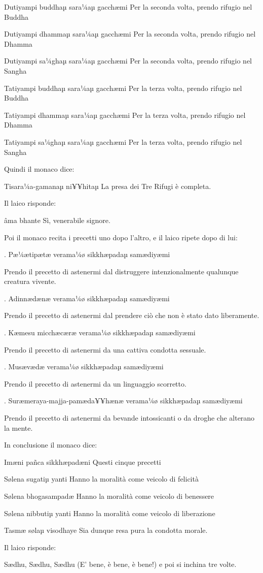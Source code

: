 Dutiyampi buddhaµ sara¼aµ gacchæmi Per la seconda volta, prendo rifugio
nel Buddha

Dutiyampi dhammaµ sara¼aµ gacchæmi Per la seconda volta, prendo rifugio
nel Dhamma

Dutiyampi sa¼ghaµ sara¼aµ gacchæmi Per la seconda volta, prendo rifugio
nel Sangha

Tatiyampi buddhaµ sara¼aµ gacchæmi Per la terza volta, prendo rifugio
nel Buddha

Tatiyampi dhammaµ sara¼aµ gacchæmi Per la terza volta, prendo rifugio
nel Dhamma

Tatiyampi sa¼ghaµ sara¼aµ gacchæmi Per la terza volta, prendo rifugio
nel Sangha

Quindi il monaco dice:

Tisara¼a-gamanaµ ni¥¥hitaµ La presa dei Tre Rifugi è completa.

Il laico risponde:

âma bhante Sì, venerabile signore.

Poi il monaco recita i precetti uno dopo l'altro, e il laico ripete dopo
di lui:

\1. Pæ¼ætipætæ verama¼ø sikkhæpadaµ samædiyæmi

Prendo il precetto di astenermi dal distruggere intenzionalmente
qualunque creatura vivente.

\2. Adinnædænæ verama¼ø sikkhæpadaµ samædiyæmi

Prendo il precetto di astenermi dal prendere ciò che non è stato dato
liberamente.

\3. Kæmesu micchæcæræ verama¼ø sikkhæpadaµ samædiyæmi

Prendo il precetto di astenermi da una cattiva condotta sessuale.

\4. Musævædæ verama¼ø sikkhæpadaµ samædiyæmi

Prendo il precetto di astenermi da un linguaggio scorretto.

\5. Suræmeraya-majja-pamæda¥¥hænæ verama¼ø sikkhæpadaµ samædiyæmi

Prendo il precetto di astenermi da bevande intossicanti o da droghe che
alterano la mente.

In conclusione il monaco dice:

Imæni pañca sikkhæpadæni Questi cinque precetti

Sølena sugatiµ yanti Hanno la moralità come veicolo di felicità

Sølena bhogasampadæ Hanno la moralità come veicolo di benessere

Sølena nibbutiµ yanti Hanno la moralità come veicolo di liberazione

Tasmæ sølaµ visodhaye Sia dunque resa pura la condotta morale.

Il laico risponde:

Sædhu, Sædhu, Sædhu (E' bene, è bene, è bene!) e poi si inchina tre
volte.
